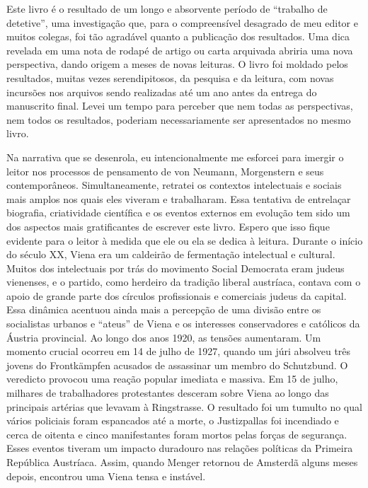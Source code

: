 \documentclass[12pt]{article}
\begin{document}
Este livro é o resultado de um longo e absorvente período de “trabalho de detetive”, uma investigação que, para o compreensível desagrado de meu editor e muitos colegas, foi tão agradável quanto a publicação dos resultados. Uma dica revelada em uma nota de rodapé de artigo ou carta arquivada abriria uma nova perspectiva, dando origem a meses de novas leituras. O livro foi moldado pelos resultados, muitas vezes serendipitosos, da pesquisa e da leitura, com novas incursões nos arquivos sendo realizadas até um ano antes da entrega do manuscrito final. Levei um tempo para perceber que nem todas as perspectivas, nem todos os resultados, poderiam necessariamente ser apresentados no mesmo livro.

Na narrativa que se desenrola, eu intencionalmente me esforcei para imergir o leitor nos processos de pensamento de von Neumann, Morgenstern e seus contemporâneos. Simultaneamente, retratei os contextos intelectuais e sociais mais amplos nos quais eles viveram e trabalharam. Essa tentativa de entrelaçar biografia, criatividade científica e os eventos externos em evolução tem sido um dos aspectos mais gratificantes de escrever este livro. Espero que isso fique evidente para o leitor à medida que ele ou ela se dedica à leitura. Durante o início do século XX, Viena era um caldeirão de fermentação intelectual e cultural. Muitos dos intelectuais por trás do movimento Social Democrata eram judeus vienenses, e o partido, como herdeiro da tradição liberal austríaca, contava com o apoio de grande parte dos círculos profissionais e comerciais judeus da capital. Essa dinâmica acentuou ainda mais a percepção de uma divisão entre os socialistas urbanos e “ateus” de Viena e os interesses conservadores e católicos da Áustria provincial. Ao longo dos anos 1920, as tensões aumentaram. Um momento crucial ocorreu em 14 de julho de 1927, quando um júri absolveu três jovens do Frontkämpfen acusados de assassinar um membro do Schutzbund. O veredicto provocou uma reação popular imediata e massiva. Em 15 de julho, milhares de trabalhadores protestantes desceram sobre Viena ao longo das principais artérias que levavam à Ringstrasse. O resultado foi um tumulto no qual vários policiais foram espancados até a morte, o Justizpallas foi incendiado e cerca de oitenta e cinco manifestantes foram mortos pelas forças de segurança. Esses eventos tiveram um impacto duradouro nas relações políticas da Primeira República Austríaca. Assim, quando Menger retornou de Amsterdã alguns meses depois, encontrou uma Viena tensa e instável.
\end{document}
